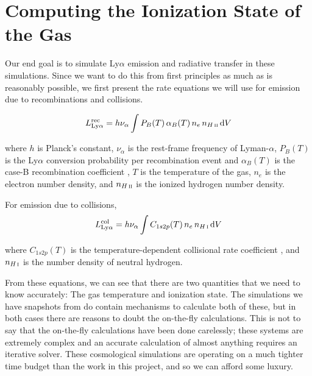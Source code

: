 \section{Computing the Ionization State of the Gas}
\label{sec:lycrt}

Our end goal is to simulate Ly$\alpha$ emission and radiative transfer in these simulations.
Since we want to do this from first principles as much as is reasonably possible, we first present the rate equations we will use for emission due to recombinations and collisions.

\begin{equation}
\label{eq:j_rec}
    L_{\rm Ly \alpha}^{\rm rec} = h\nu_{\alpha} \int P_B(T)\,\alpha_B(T)\,n_e\,n_{{H\,\textsc{ii}}}\,\mathrm{d}V
\end{equation}

\noindent where $h$ is Planck's constant, $\nu_{\alpha}$ is the rest-frame frequency of Lyman-$\alpha$, $P_B(T)$ is the Ly$\alpha$ conversion probability per recombination event and $\alpha_B(T)$ is the case-B recombination coefficient \citep{Cantalupo2005, Dijkstra2014, Hui1997}, $T$ is the temperature of the gas, $n_{e}$ is the electron number density, and $n_{{H\,\textsc{ii}}}$ is the ionized hydrogen number density.

For emission due to collisions,
\begin{equation}
\label{eq:j_col}
    L_{\rm Ly \alpha}^{\rm col} = h\nu_{\alpha} \int C_{1s2p}(T)\,n_e\,n_{H\,\textsc{i}}\,\mathrm{d}V
\end{equation}

\noindent where $C_{1s2p}(T)$ is the temperature-dependent collisional rate coefficient \citep{Scholz1991}, and $n_{{H\,\textsc{i}}}$ is the number density of neutral hydrogen.

From these equations, we can see that there are two quantities that we need to know accurately: The gas temperature and ionization state.
The simulations we have snapshots from do contain mechanisms to calculate both of these, but in both cases there are reasons to doubt the on-the-fly calculations.
This is not to say that the on-the-fly calculations have been done carelessly; these systems are extremely complex and an accurate calculation of almost anything requires an iterative solver.
These cosmological simulations are operating on a much tighter time budget than the work in this project, and so we can afford some luxury.

